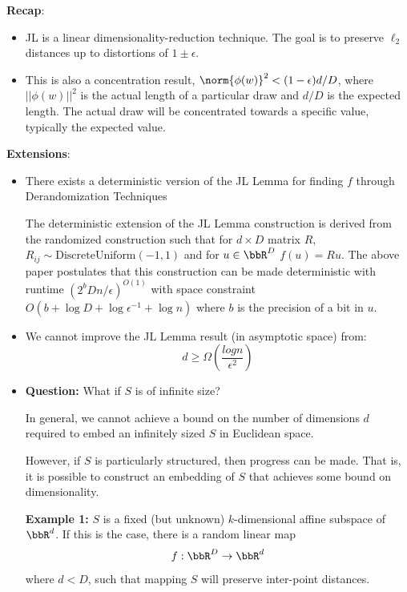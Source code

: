 \noindent\textbf{Recap}: 

\begin{itemize}
\item JL is a linear dimensionality-reduction technique. The goal is
  to preserve $\ell_{2}$ distances up to distortions of $1\pm
  \epsilon$. 

\item This is also a concentration result, $\norm{\phi(w)}^{2} <
  (1-\epsilon)d/D$, where $||\phi(w)||^{2}$ is the actual length of a
  particular draw and $d/D$ is the expected length. The actual draw
  will be concentrated towards a specific value, typically the
  expected value.  

\end{itemize}

\noindent
\textbf{Extensions}:
\begin{itemize}
  \item There exists a deterministic version of the JL Lemma for finding 
  $f$ through Derandomization Techniques \cite{sivakumarderandom}

  The deterministic extension of the JL Lemma construction is derived from 
  the randomized construction such that for $d\times D$ matrix $R$, 
  $R_{ij} \sim \text{DiscreteUniform}(-1,1)$ and for $u \in \bbR^D$ 
  $f(u) = Ru$. The above paper postulates that this construction can be 
  made deterministic with runtime $(2^b D n/\epsilon)^{O(1)}$ with space 
  constraint $O(b + \log D + \log \epsilon^{-1} + \log n)$ where $b$ is 
  the precision of a bit in $u$. 

  \item We cannot improve the JL Lemma result (in asymptotic space) from:
  $$d \geq \Omega(\frac{log n}{\epsilon^2})$$
  

  \item \textbf{Question:} What if $S$ is of infinite size? 


  In general, we cannot achieve a bound on the number of dimensions $d$ 
  required to embed an infinitely sized $S$ in Euclidean space. 


  However, if $S$ is particularly structured, then progress can be made. 
  That is, it is possible to construct an embedding of $S$ that achieves 
  some bound on dimensionality.


\indent
      \textbf{Example 1:} $S$ is a fixed (but unknown) $k$-dimensional affine subspace of $\bbR^d$. If this is the case, there is a random linear map
  $$f : \bbR^D \rightarrow \bbR^d $$ where $d < D$, such that mapping $S$ will preserve inter-point distances.




\end{itemize}
